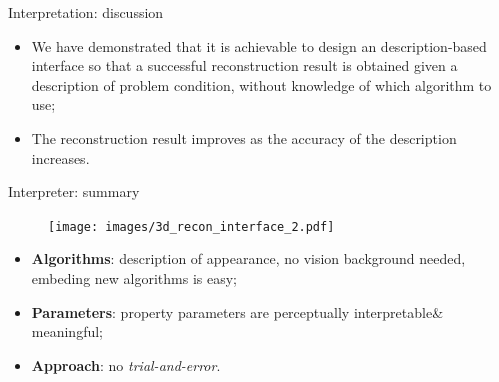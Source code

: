\documentclass[10pt]{beamer}
\begin{document}
\begin{frame}{Interpretation: discussion}

\begin{exampleblock}{}
\begin{itemize}
\item We have demonstrated that it is achievable to design an description-based interface so that a successful reconstruction result is obtained given a description of problem condition, without knowledge of which algorithm to use;
\item The reconstruction result improves as the accuracy of the description increases.
\end{itemize}
\end{exampleblock}

\end{frame}

\begin{frame}{Interpreter: summary}

\begin{figure}
\centering
\texttt{[image: images/3d\_recon\_interface\_2.pdf]}
\end{figure}

\begin{exampleblock}{}
  \begin{itemize}
    \item \textbf{Algorithms}: description of appearance, no vision background needed, embeding new algorithms is easy;
    \item \textbf{Parameters}: property parameters are perceptually interpretable\& meaningful;
    \item \textbf{Approach}: no \textit{trial-and-error}.
  \end{itemize}
\end{exampleblock}

\end{frame}

\end{document}

